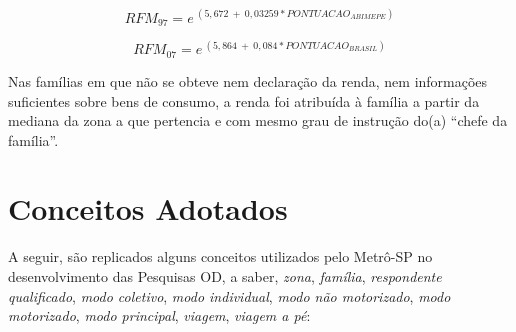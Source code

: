 \begin{equation}\label{eq:reg-renda-97}
RFM_{97} = e^{~(5,672~+~0,03259*PONTUACAO_{ABIMEPE})}
\end{equation}

\begin{equation}\label{eq:reg-renda-07}
RFM_{07} = e^{~(5,864~+~0,084*PONTUACAO_{BRASIL})}
\end{equation}

Nas famílias em que não se obteve nem declaração da renda, nem informações suficientes sobre bens de consumo, a renda foi atribuída à família a partir da mediana da zona a que pertencia e com mesmo grau de instrução do(a) ``chefe da família''.

\section{Conceitos Adotados}\label{sec:conceitos}

A seguir, são replicados alguns conceitos utilizados pelo Metrô-SP no desenvolvimento das Pesquisas OD, a saber, \emph{zona}, \emph{família}, \emph{respondente qualificado}, \emph{modo coletivo}, \emph{modo individual}, \emph{modo não motorizado}, \emph{modo motorizado}, \emph{modo principal}, \emph{viagem}, \emph{viagem a pé}: 

